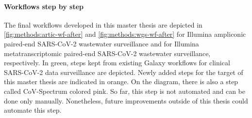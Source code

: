             \paragraph{Workflows step by step} \label{sec:methods:changes:step-by-step}
            The final workflows developed in this master thesis are depicted in \cref{fig:methods:artic-wf-after} and \cref{fig:methods:wgs-wf-after} for Illumina ampliconic paired-end SARS-CoV-2 wastewater surveillance and for Illumina metatranscriptomic paired-end SARS-CoV-2 wastewater surveillance, respectively. In green, steps kept from existing Galaxy workflows for clinical SARS-CoV-2 data surveillance are depicted. Newly added steps for the target of this master thesis are indicated in orange. On the diagram, there is also a step called CoV-Spectrum colored pink. So far, this step is not automated and can be done only manually. Nonetheless, future improvements outside of this thesis could automate this step.
            
